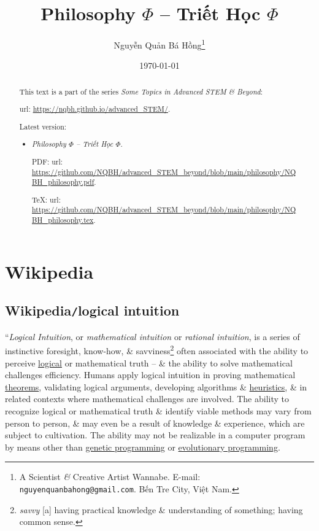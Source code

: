 \documentclass{article}
\title{Philosophy $\Phi$ -- Triết Học $\Phi$}
\author{Nguyễn Quản Bá Hồng\footnote{A Scientist {\it\&} Creative Artist Wannabe. E-mail: {\tt nguyenquanbahong@gmail.com}. Bến Tre City, Việt Nam.}}
\date{\today}
\begin{document}
\maketitle
\begin{abstract}
	This text is a part of the series {\it Some Topics in Advanced STEM \& Beyond}:
	
	{\sc url}: \url{https://nqbh.github.io/advanced_STEM/}.
	
	Latest version:
	\begin{itemize}
		\item {\it Philosophy $\Phi$ -- Triết Học $\Phi$}.
		
		PDF: {\sc url}: \url{https://github.com/NQBH/advanced_STEM_beyond/blob/main/philosophy/NQBH_philosophy.pdf}.
		
		\TeX: {\sc url}: \url{https://github.com/NQBH/advanced_STEM_beyond/blob/main/philosophy/NQBH_philosophy.tex}.
	\end{itemize}
\end{abstract}
\tableofcontents


\section{Wikipedia}

\subsection{Wikipedia{\tt/}logical intuition}
``{\it Logical Intuition}, or {\it mathematical intuition} or {\it rational intuition}, is a series of instinctive foresight, know-how, \& savviness\footnote{{\it savvy} [a] having practical knowledge \& understanding of something; having common sense.} often associated with the ability to perceive \href{https://en.wikipedia.org/wiki/Logic}{logical} or mathematical truth -- \& the ability to solve mathematical challenges efficiency. Humans apply logical intuition in proving mathematical \href{https://en.wikipedia.org/wiki/Theorem}{theorems}, validating logical arguments, developing algorithms \& \href{https://en.wikipedia.org/wiki/Heuristic}{heuristics}, \& in related contexts where mathematical challenges are involved. The ability to recognize logical or mathematical truth \& identify viable methods may vary from person to person, \& may even be a result of knowledge \& experience, which are subject to cultivation. The ability may not be realizable in a computer program by means other than \href{https://en.wikipedia.org/wiki/Genetic_programming}{genetic programming} or \href{https://en.wikipedia.org/wiki/Evolutionary_programming}{evolutionary programming}.
\end{document}
